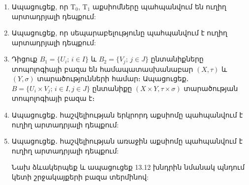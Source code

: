 \begin{enumerate}[label=\thesection.\arabic*., resume]

\item Ապացուցեք, որ $\textrm{T}_0$, $\textrm{T}_1$ աքսիոմները պահպանվում են ուղիղ արտադրյալի դեպ\-քում:

\item Ապացուցեք, որ սեպարաբելությունը պահպանվում է ուղիղ արտադրյալի դեպ\-քում:

\item Դիցուք $B_1=\{U_i;\, i \in I\}$ և $B_2=\{V_j;\, j \in J\}$ ընտանիքները տոպոլոգիայի բազա են համապատասխանաբար $(X, \tau)$ և $(Y, \sigma)$ տարածությունների հա\-մար։ Ապացուցեք․ $B=\{U_i \times V_j;\, i \in I, j \in J\}$ ընտանիքը $(X \times Y, \tau \times \sigma)$ տարածու\-թյան տոպոլոգիայի բազա է։

\item Ապացուցեք․ հաշվելիության երկրորդ աքսիոմը պահպանվում է ուղիղ ար\-տա\-դրյալի դեպքում:

\item Ապացուցեք․ հաշվելիության առաջին աքսիոմը պահպանվում է ուղիղ ար\-տա\-դրյալի դեպքում:

\begin{hint}
Նախ ձևակերպեք և ապացուցեք 13.12 խնդրին նմանակ պնդում կետի շրջակայքերի բազա տերմինով:
\end{hint}

\end{enumerate}
